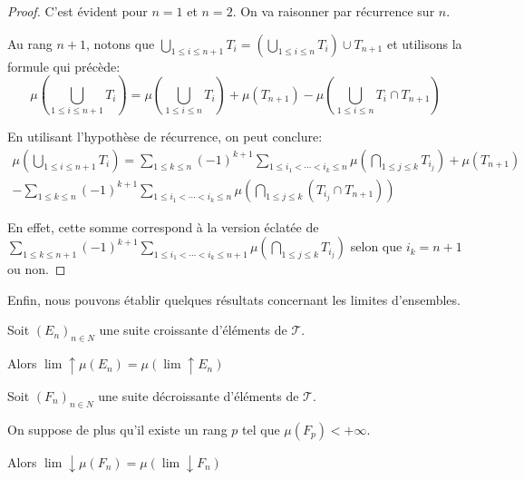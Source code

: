 \begin{proof}
C'est évident pour $n=1$ et $n=2$. On va raisonner par récurrence sur $n$.

Au rang $n+1$, notons que $\bigcup \limits_{1 \leq i \leq n+1} T_i = \left(\bigcup \limits_{1 \leq i \leq n} T_i\right) \cup T_{n+1}$ et utilisons la formule qui précède:
\[
\mu\left(\bigcup \limits_{1 \leq i \leq n+1} T_i\right) = \mu\left(\bigcup \limits_{1 \leq i \leq n} T_i\right)+\mu(T_{n+1})-\mu\left(\bigcup \limits_{1 \leq i \leq n} T_i \cap T_{n+1}\right)
\]

En utilisant l'hypothèse de récurrence, on peut conclure:
\begin{multline*}
\mu\left(\bigcup \limits_{1 \leq i \leq n+1} T_i\right) = \displaystyle{\sum \limits_{1 \leq k \leq n}}(-1)^{k+1}\displaystyle{\sum \limits_{1 \leq i_1 < \cdots < i_k \leq n}}\mu\left(\bigcap \limits_{1 \leq j \leq k} T_{i_j}\right)+\mu(T_{n+1})\\
-\displaystyle{\sum \limits_{1 \leq k \leq n}}(-1)^{k+1}\displaystyle{\sum \limits_{1 \leq i_1 < \cdots < i_k \leq n}}\mu\left(\bigcap \limits_{1 \leq j \leq k} (T_{i_j} \cap T_{n+1})\right)
\end{multline*}

En effet, cette somme correspond à la version éclatée de $\displaystyle{\sum \limits_{1 \leq k \leq n+1}}(-1)^{k+1}\displaystyle{\sum \limits_{1 \leq i_1 < \cdots < i_k \leq n+1}}\mu\left(\bigcap \limits_{1 \leq j \leq k} T_{i_j}\right)$ selon que $i_k=n+1$ ou non.
\end{proof}


Enfin, nous pouvons établir quelques résultats concernant les limites d'ensembles.

\begin{prop}
Soit $\left(E_n\right)_{n \in N}$ une suite croissante d'éléments de $\mathcal{T}$.

Alors $\lim \uparrow \mu(E_n) = \mu\left( \lim \uparrow E_n\right)$

\medskip
Soit $\left(F_n\right)_{n \in N}$ une suite décroissante d'éléments de $\mathcal{T}$.

On suppose de plus qu'il existe un rang $p$ tel que $\mu(F_p)<+\infty$.

Alors $\lim \downarrow \mu(F_n) = \mu\left( \lim \downarrow F_n\right)$
\end{prop}


